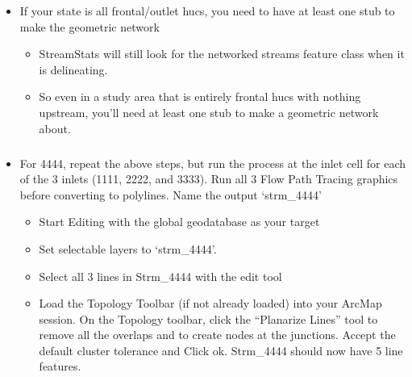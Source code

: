 \documentclass[letterpaper,10pt,english]{sphinxmanual}
\begin{document}
\begin{itemize}
\begin{itemize}
\begin{itemize}
\end{itemize}

\item {} 
If your state is all frontal/outlet hucs, you need to have at least one stub to make the geometric network
\begin{itemize}
\item {} 
StreamStats will still look for the networked streams feature class when it is delineating.

\item {} 
So even in a study area that is entirely frontal hucs with nothing upstream, you’ll need at least one stub to make a geometric network about.

\end{itemize}

\end{itemize}

\end{itemize}


\subparagraph{}
\label{\detokenize{ex_2:convert-to-features-multiple-streams}}\begin{itemize}
\item {} 
For 4444, repeat the above steps, but run the process at the inlet cell for each of the 3 inlets (1111, 2222, and 3333).  Run all 3 Flow Path Tracing graphics before converting to polylines.  Name the output ‘strm\_4444’
\begin{itemize}
\item {} 
Start Editing with the global geodatabase as your target

\item {} 
Set selectable layers to ‘strm\_4444’.

\item {} 
Select all 3 lines in Strm\_4444 with the edit tool

\item {} 
Load the Topology Toolbar (if not already loaded) into your ArcMap session.  On the Topology toolbar, click the “Planarize Lines” tool to remove all the overlaps and to create nodes at the junctions. Accept the default cluster tolerance and Click ok.  Strm\_4444  should now have 5 line features.

\end{itemize}

\end{itemize}
\end{document}
